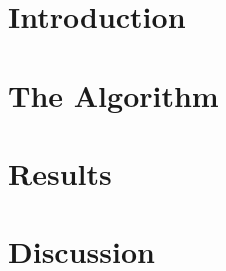 
\mainmatter


\chapter{Introduction}

\FloatBarrier

\chapter{The Algorithm}


\FloatBarrier

\chapter{Results}

\FloatBarrier


\chapter{Discussion}


\FloatBarrier
